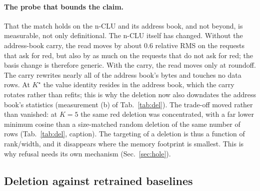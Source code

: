 \documentclass{article} %
\newcommand{\Kstar}{\ensuremath{K^{\star}}}
\begin{document}
\paragraph{The probe that bounds the claim.} That the match holds on the n-CLU and its address book,
and not beyond, is measurable, not only definitional.
The n-CLU itself has changed. Without the address-book carry, the read moves by about 0.6
relative RMS on the requests that ask for red, but also by as much on the requests
that do not ask for red; the basis change is therefore generic. With the carry,
the read moves only at roundoff. The carry rewrites
nearly all of the address book's bytes and touches no data rows. %
At $\Kstar$ the value identity
resides in the address book, which the carry rotates rather than refits; this is why the deletion
now also downdates the address book's statistics (measurement (b) of Tab.~\ref{tab:del}). The trade-off moved
rather than vanished: at $K=5$ the same red deletion was concentrated, with
a far lower minimum cosine than a size-matched random deletion of the same number of
rows (Tab.~\ref{tab:del}, caption). %
The targeting of a deletion is thus a function of rank/width, and it disappears where the memory footprint
is smallest. This is why refusal needs its own mechanism (Sec.~\ref{sec:hole}).

\subsection{Deletion against retrained baselines}
\label{sec:del-comparators}
\end{document}
